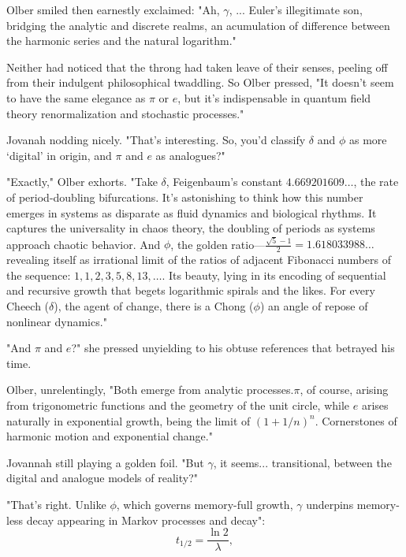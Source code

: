 Olber smiled then earnestly exclaimed: "Ah, \(\gamma\), ... Euler’s illegitimate son, bridging the analytic and discrete realms, an acumulation of difference between the harmonic series and the natural logarithm."

Neither had noticed that the throng had taken leave of their senses, peeling off from their indulgent philosophical twaddling. So Olber pressed, "It doesn’t seem to have the same elegance as \(\pi\) or \(e\), but it’s indispensable in quantum field theory renormalization and stochastic processes."

Jovanah nodding nicely. "That’s interesting. So, you’d classify \(\delta\) and \(\phi\) as more ‘digital’ in origin, and \(\pi\) and \(e\) as analogues?"

"Exactly," Olber exhorts. "Take \(\delta\), Feigenbaum’s constant $4.669201609\ldots$, the rate of period-doubling bifurcations. It's astonishing to think how this number emerges in systems as disparate as fluid dynamics and biological rhythms. It captures the universality in chaos theory, the doubling of periods as systems approach chaotic behavior. And \(\phi\), the golden ratio—$\frac{\sqrt{5} - 1}{2} = 1.618033988\ldots$ revealing itself as irrational limit of the ratios of adjacent Fibonacci numbers of the sequence: $1, 1, 2, 3, 5, 8, 13, \ldots$. Its beauty, lying in its encoding of sequential and recursive growth that begets logarithmic spirals and the likes. For every Cheech ($\delta$), the agent of change, there is a Chong ($\phi$) an angle of repose of nonlinear dynamics."

"And \(\pi\) and \(e\)?" she pressed unyielding to his obtuse references that betrayed his time.

Olber, unrelentingly, "Both emerge from analytic processes.\(\pi\), of course, arising from trigonometric functions and the geometry of the unit circle, while \(e\) arises naturally in exponential growth, being the limit of \((1 + 1/n)^n\). Cornerstones of harmonic motion and exponential change."

Jovannah still playing a golden foil. "But \(\gamma\), it seems... transitional, between the digital and analogue models of reality?"

"That’s right. Unlike \(\phi\), which governs memory-full growth, \(\gamma\) underpins memory-less decay appearing in Markov processes and decay":
\[
t_{1/2} = \frac{\ln 2}{\lambda},
\]

